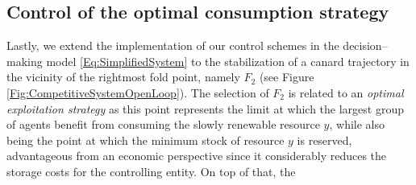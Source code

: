 \documentclass[3p]{elsarticle}
\theoremstyle{plain}
\theoremstyle{remark}
\theoremstyle{definition}
\begin{document}
    \subsection{Control of the optimal consumption strategy}
    \label{SubSec:OptimalStrategy}
        Lastly, we extend the implementation of our control schemes in the decision--making model \eqref{Eq:SimplifiedSystem} to the stabilization of a canard trajectory in the vicinity of the rightmost fold point, namely $F_{2}$ (see Figure \ref{Fig:CompetitiveSystemOpenLoop}). The selection of $F_2$ is related to an \emph{optimal exploitation strategy} as this point represents the limit at which the largest group of agents benefit from consuming the slowly renewable resource $y$, while  also being the point at which the minimum stock of resource $y$ is reserved, advantageous from an economic perspective since it considerably reduces the storage costs for the controlling entity. On top of that, the 
\end{document}
